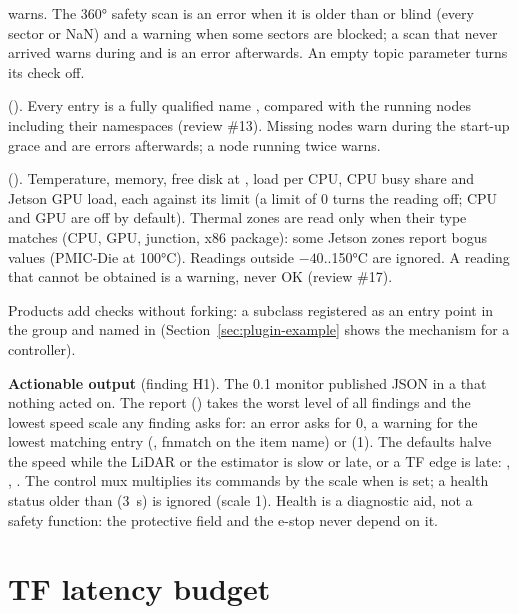 \begin{description}
    warns. The 360° safety scan is an error when it is older than  or
    blind (every sector  or NaN) and a warning when some sectors are blocked; a
    scan that never arrived warns during  and is an error afterwards.
    An empty topic parameter turns its check off.
  \item[Nodes] (). Every  entry is a fully qualified
    name , compared with the running nodes including their namespaces
    (review \#13). Missing nodes warn during the start-up grace and are errors afterwards; a node
    running twice warns.
  \item[System] (). Temperature, memory, free disk at , load
    per CPU, CPU busy share and Jetson GPU load, each against its limit (a limit of 0 turns the
    reading off; CPU and GPU are off by default). Thermal zones are read only when their type
    matches  (CPU, GPU, junction, x86 package): some Jetson zones
    report bogus values (PMIC-Die at 100°C). Readings outside $-40$..150°C are ignored. A reading
    that cannot be obtained is a warning, never OK (review \#17).
\end{description}

Products add checks without forking: a  subclass registered as an entry point in
the group  and named in 
(Section~\ref{sec:plugin-example} shows the mechanism for a controller).

\textbf{Actionable output} (finding H1). The 0.1 monitor published JSON in a
 that nothing acted on. The report () takes the worst
level of all findings and the lowest speed scale any finding asks for: an error asks for 0, a
warning for the lowest matching  entry (,
fnmatch on the item name) or  (1). The defaults halve the speed while the LiDAR
or the estimator is slow or late, or a TF edge is late:
, , . The control mux
multiplies its commands by the scale when  is set; a health status older
than  (3~s) is ignored (scale 1). Health is a diagnostic aid, not a
safety function: the protective field and the e-stop never depend on it.

\section{TF latency budget}
\label{sec:tf-budget}

